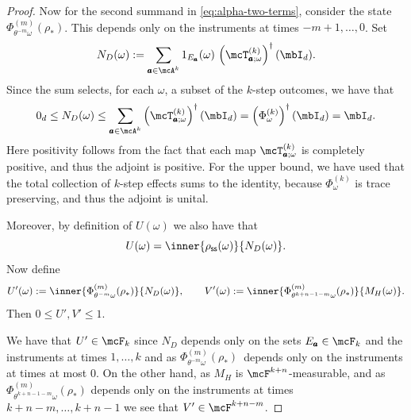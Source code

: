 \documentclass[a4paper]{article}
\numberwithin{equation}{section}   %
\theoremstyle{plain}   %
\theoremstyle{plain}   %
\theoremstyle{examplestyle}
\newcommand{\adj}{^\dagger}         %
\newcommand{\s}{\rho_{\mathsf{ss}}}     %
\begin{document}
\begin{proof}
           Now for the second summand in \eqref{eq:alpha-two-terms}, consider the state \(\Phi_{\theta^{-m}\omega}^{(m)}(\rho_\ast)\). 
           This depends only on the instruments at times $-m+1, \ldots , 0$.
           Set
            \[
                N_D(\omega)
                :=
                \sum_{\pmb a\in\mcA^k}
                1_{E_{\pmb a}}(\omega)\,
                \left(
                    \mcT_{\pmb a;\omega}^{(k)}
                \right)\adj(\mbI_d).
            \]
            Since the sum selects, for each \(\omega\), a subset of the \(k\)-step outcomes, we have that
            \[
                0_d
                \le
                N_D(\omega)
                \le
                \sum_{\pmb a\in\mcA^k}
                \left(
                    \mcT_{\pmb a;\omega}^{(k)}
                \right)\adj(\mbI_d)
                =
                \left(
                    \Phi_\omega^{(k)}
                \right)\adj(\mbI_d)
                =
                \mbI_d.
            \]
            Here positivity follows from the fact that each map $\mcT^{(k)}_{\pmb a;\omega}$ is completely positive, and thus the adjoint is positive. 
            For the upper bound, we have used that the total collection of $k$-step effects sums to the identity, because $\Phi^{(k)}_\omega$ is trace preserving, and thus the adjoint is unital. 
            
            Moreover, by definition of $U(\omega)$ we also have that 
            \[
                U(\omega)
                =
                \inner{\s(\omega)}{N_D(\omega)}.
            \]
            Now define
            \[
                U'(\omega)
                :=
                \inner{\Phi_{\theta^{-m}\omega}^{(m)}(\rho_\ast)}{N_D(\omega)},
                \qquad
                V'(\omega)
                :=
                \inner{
                   \Phi_{\theta^{k+n-1-m}\omega}^{(m)}(\rho_\ast)
                }{
                    M_H(\omega)
                }.
            \]
            Then \(0\le U',V'\le1\).
        
            We have that \( U'\in\mcF_k\) since \(N_D\) depends only on the sets \(E_{\pmb a}\in\mcF_k\) and the instruments at times \(1,\ldots,k\) and as \( \Phi_{\theta^{-m}\omega}^{(m)}(\rho_\ast)\)\ depends only on the instruments at times at most \(0\).
            On the other hand, as \(M_H\) is \(\mcF^{k+n}\)-measurable, and as \( \Phi_{\theta^{k+n-1-m}\omega}^{(m)}(\rho_\ast)\) depends only on the instruments at times \(k+n-m, \ldots, k+n-1\) we see that $V'\in \mcF^{k+n-m}$. 
        

\end{proof}
\end{document}
